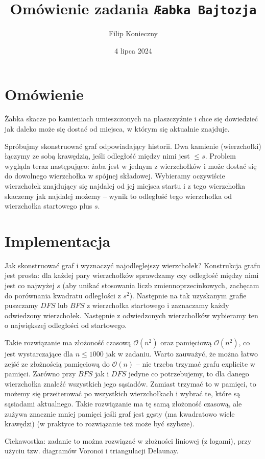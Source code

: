 \documentclass[]{article}
\author{Filip Konieczny}
\date{4 lipca 2024}
\title{Omówienie zadania \texttt{Æabka Bajtozja}}
\newcommand{\Oh}[1]{\mathcal{O}{\left(#1\right)}}
\begin{document}
\maketitle
\section{Omówienie}

Żabka skacze po kamieniach umieszczonych na płaszczyźnie i chce się dowiedzieć jak daleko może się dostać od miejsca, w którym się aktualnie znajduje.

Spróbujmy skonstruować graf odpowiadający historii. Dwa kamienie (wierzchołki) łączymy ze sobą krawędzią, jeśli odległość między nimi jest $\leq s$. Problem wygląda teraz następująco: żaba jest w jednym z wierzchołków i może dostać się do dowolnego wierzchołka w spójnej składowej. Wybieramy oczywiście wierzchołek znajdujący się najdalej od jej miejsca startu i z tego wierzchołka skaczemy jak najdalej możemy -- wynik to odległość tego wierzchołka od wierzchołka startowego plus $s$.


\section{Implementacja}

Jak skonstruować graf i wyznaczyć najodleglejszy wierzchołek? Konstrukcja grafu jest prosta: dla każdej pary wierzchołków sprawdzamy czy odległość między nimi jest co najwyżej $s$ (aby unikać stosowania liczb zmiennoprzecinkowych, zachęcam do porównania kwadratu odległości z $s^2$). Następnie na tak uzyskanym grafie puszczamy $DFS$ lub $BFS$ z wierzchołka startowego i zaznaczamy każdy odwiedzony wierzchołek. Następnie z odwiedzonych wierzchołków wybieramy ten o największej odległości od startowego.

Takie rozwiązanie ma złożoność czasową $\Oh{n^2}$ oraz pamięciową $\Oh{n^2}$, co jest wystarczające dla $n \leq 1000$ jak w zadaniu. Warto zauważyć, że można łatwo zejść ze złożnością pamięciową do $\Oh{n}$ -- nie trzeba trzymać grafu explicite w pamięci. Zarówno przy $BFS$ jak i $DFS$ jedyne co potrzebujemy, to dla danego wierzchołka znaleźć wszystkich jego sąsiadów. Zamiast trzymać to w pamięci, to możemy się przeiterować po wszystkich wierzchołkach i wybrać te, które są sąsiadami aktualnego. Takie rozwiązanie ma tę samą złożoność czasową, ale zużywa znacznie mniej pamięci jeśli graf jest gęsty (ma kwadratowo wiele krawędzi) (w praktyce to rozwiązanie też może być szybsze).

Ciekawostka: zadanie to można rozwiązać w złożności liniowej (z logami), przy użyciu tzw. diagramów Voronoi i triangulacji Delaunay.
\end{document}
